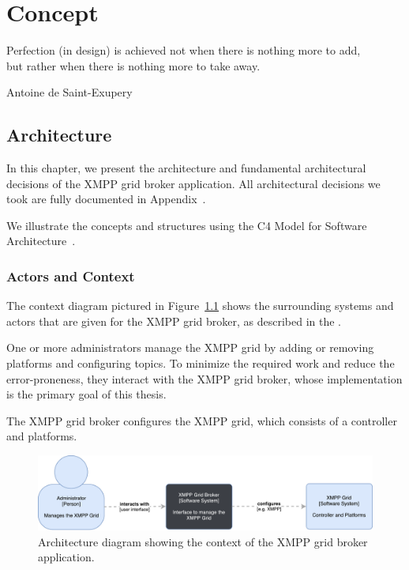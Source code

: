 \chapter{Concept} %
\epigraph{Perfection (in design) is achieved not when there is nothing more to add,\\but rather when there is nothing more to take away.}{Antoine de Saint-Exupery}


\section{Architecture}

In this chapter, we present the architecture and fundamental architectural decisions of the XMPP grid broker application.
All architectural decisions we took are fully documented in Appendix~.

We illustrate the concepts and structures using the C4 Model for Software Architecture~\cite{c4-model}.

\subsection{Actors and Context}

The context diagram pictured in Figure~\ref{fig:architecturecontext} shows the surrounding systems and actors that are given for the XMPP grid broker, as described in the .

One or more administrators manage the XMPP grid by adding or removing \glspl{platform} and configuring \glspl{topic}.
To minimize the required work and reduce the error-proneness, they interact with the XMPP grid broker, whose implementation is the primary goal of this thesis.

The XMPP grid broker configures the XMPP grid, which consists of a \gls{controller} and \glspl{platform}.

\begin{figure}[h]
\centering
\includegraphics[width=\linewidth]{resources/architecture_context}
\caption[Architecture Context Diagram]{Architecture diagram showing the context of the XMPP grid broker application.}
\label{fig:architecturecontext}
\end{figure}


